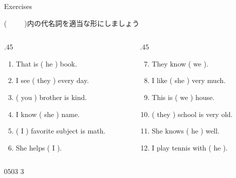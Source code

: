 \documentclass[aspectratio=169,xcolor={dvipsnames,table}]{beamer}
\begin{document}
\begin{frame}[plain]{Exercises}

{\small (~~~~~)内の代名詞を適当な形にしましょう}

\begin{columns}[t]
 \begin{column}{.45\textwidth}
   \begin{enumerate}
  \item That is ( he ) book.\hfill{}
  \item I see ( they ) every day.\hfill{}
  \item ( you ) brother is kind.\hfill{}
  \item I know ( she ) name.\hfill{}
  \item ( I ) favorite subject is math.\hfill{}
  \item She helps ( I ).\hfill{}
 \end{enumerate}
 \end{column}
\begin{column}{.45\textwidth}
  \begin{enumerate}\setcounter{enumi}{6}
  \item They know ( we ).\hfill{}
  \item I like ( she ) very much.\hfill{}
  \item This is ( we ) house.\hfill{}
  \item ( they ) school is very old.\hfill{}
  \item She knows ( he ) well.\hfill{}
  \item I play tennis with ( he ).\hfill{}
 \end{enumerate}
\end{column}
\end{columns}

\hfill{\tiny 0503}\,{\scriptsize {}\,3}
\end{frame}
\end{document}

